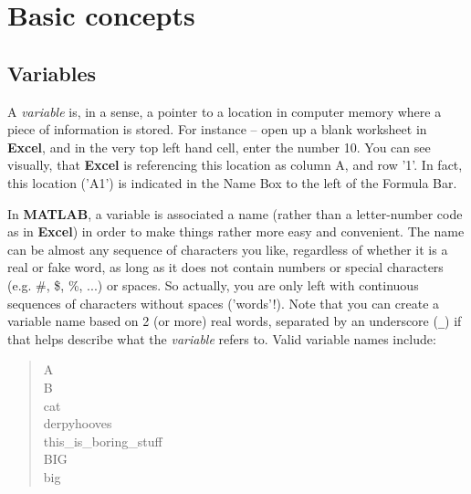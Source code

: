 \documentclass{tufte-book} %
\newenvironment{docspec}{\begin{quotation}\ttfamily\parskip0pt\parindent0pt\ignorespaces}{\end{quotation}}
\begin{document}

\section{Basic concepts}


\subsection{Variables}

A \textit{variable} is, in a sense, a pointer to a location in computer memory where a piece of information is stored. For instance -- open up a blank worksheet in \textbf{Excel}, and in the very top left hand cell, enter the number \textsf{10}. You can see visually, that \textbf{Excel} is referencing this location as column A, and row '1'. In fact, this location ('\textsf{A1}') is indicated in the \textsf{Name Box} to the left of the \textsf{Formula Bar}.

In \textbf{MATLAB}, a variable is associated a name (rather than a letter-number code as in \textbf{Excel}) in order to make things rather more easy and convenient. The name can be almost any sequence of characters you like, regardless of whether it is a real or fake word, as long as it does not contain numbers or special characters (e.g. \#, \$, \%, ...) or spaces. So actually, you are only left with continuous sequences of characters without spaces ('words'!). Note that you can  create a variable name based on 2 (or more) real words, separated by an underscore (\texttt{\_}) if that helps describe what the \textit{variable} refers to. Valid variable names  include:

\begin{docspec}
A\\
B\\
cat\\
derpyhooves\\
this\_is\_boring\_stuff\\
BIG\\
big
\end{docspec}  
\end{document}
